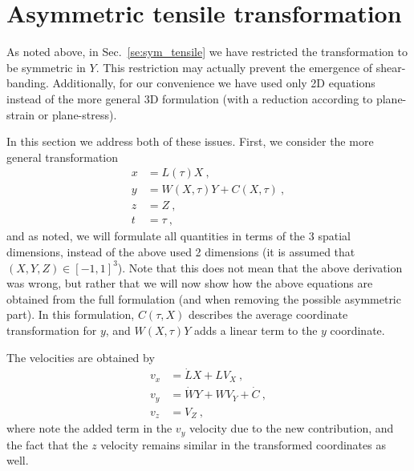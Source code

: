 \documentclass[12pt,a4paper]{article}
\begin{document}
\section{Asymmetric tensile transformation} \label{se:asym_tensile}
As noted above, in Sec.~\ref{se:sym_tensile} we have restricted the transformation to be symmetric in $Y$. This restriction may actually prevent the emergence of shear-banding. Additionally, for our convenience we have used only 2D equations instead of the more general 3D formulation (with a reduction according to plane-strain or plane-stress).

In this section we address both of these issues. First, we consider the more general transformation
\begin{equation}\label{eq:transformations_asym_tensile}
  \begin{split}
     x &= L\left(\tau\right) X \ , \\
     y &= W\left(X,\tau\right) Y + C\left(X,\tau\right)\ , \\
     z &= Z \ , \\
     t &= \tau \ ,
  \end{split}
\end{equation}
and as noted, we will formulate all quantities in terms of the 3 spatial dimensions, instead of the above used 2 dimensions (it is assumed that $\left(X,Y,Z\right)\in\left[-1,1\right]^3$). Note that this does not mean that the above derivation was wrong, but rather that we will now show how the above equations are obtained from the full formulation (and when removing the possible asymmetric part). In this formulation, $C\left(\tau,X\right)$ describes the average coordinate transformation for $y$, and $W\left(X,\tau\right) Y$ adds a linear term to the $y$ coordinate.

The velocities are obtained by
\begin{equation}\label{eq:velocity_asym_tensile}
  \begin{split}
     v_x & = \dot{L} X + L V_X \ ,\\
     v_y & = \dot{W} Y + W V_Y + \dot{C}\ , \\
     v_z & = V_Z \ ,
  \end{split}
\end{equation}
where note the added term in the $v_y$ velocity due to the new contribution, and the fact that the $z$ velocity remains similar in the transformed coordinates as well.
\end{document}
